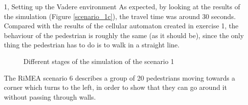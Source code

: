 \documentclass[10pt,a4paper]{article}
\begin{document}
\begin{task}{1, Setting up the Vadere environment}
As expected, by looking at the results of the simulation (Figure \ref{scenario_1c}), the travel time was around 30 seconds. Compared with the results of the cellular automaton created in exercise 1, the behaviour of the pedestrian is roughly the same (as it should be), since the only thing the pedestrian has to do is to walk in a straight line.
\begin{figure} [H]
 \centering
 \caption{Different stages of the simulation of the scenario 1}
 \label{scenario1_sim}
\end{figure}

\clearpage


The RiMEA scenario 6 describes a group of 20 pedestrians moving towards a corner which turns to the left, in order to show that they can go around it without passing through walls.


\end{task}
\end{document}
